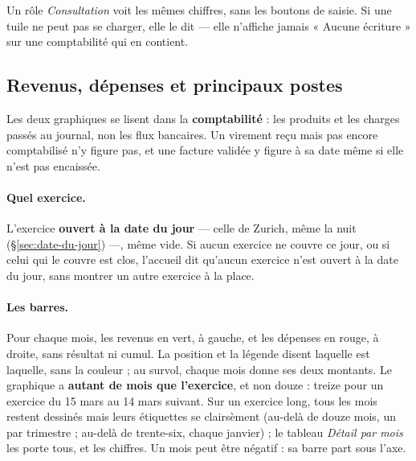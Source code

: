 \documentclass[a4paper,11pt,oneside]{article}
\begin{document}
Un rôle \emph{Consultation} voit les mêmes chiffres, sans les boutons de saisie. Si une
tuile ne peut pas se charger, elle le dit — elle n'affiche jamais « Aucune écriture » sur
une comptabilité qui en contient.

\subsection{Revenus, dépenses et principaux postes}\label{sec:graphiques-accueil}

Les deux graphiques se lisent dans la \textbf{comptabilité} : les produits et les charges
passés au journal, non les flux bancaires. Un virement reçu mais pas encore comptabilisé
n'y figure pas, et une facture validée y figure à sa date même si elle n'est pas encaissée.

\paragraph{Quel exercice.} L'exercice \textbf{ouvert à la date du jour} --- celle de Zurich, même
la nuit (\S\ref{sec:date-du-jour}) ---, même vide. Si aucun
exercice ne couvre ce jour, ou si celui qui le couvre est clos, l'accueil dit qu'aucun
exercice n'est ouvert à la date du jour, sans montrer un autre exercice à la place.

\paragraph{Les barres.} Pour chaque mois, les revenus en vert, à gauche, et les dépenses en
rouge, à droite, sans résultat ni cumul. La position et la légende disent laquelle est
laquelle, sans la couleur ; au survol, chaque mois donne ses deux montants.
Le graphique a \textbf{autant de mois que l'exercice}, et non douze :
treize pour un exercice du 15 mars au 14 mars suivant. Sur un exercice long, tous les mois
restent dessinés mais leurs étiquettes se clairsèment (au-delà de douze mois, un par
trimestre ; au-delà de trente-six, chaque janvier) ; le tableau \emph{Détail par mois} les
porte tous, et les chiffres. Un mois peut être négatif : sa barre part sous l'axe.
\end{document}
